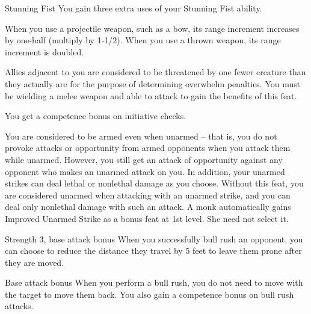  Stunning Fist
 You gain three extra uses of your Stunning Fist ability.

 When you use a projectile weapon, such as a bow, its range increment increases by one-half (multiply by 1-1/2). When you use a thrown weapon, its range increment is doubled.


 Allies adjacent to you are considered to be threatened by one fewer creature than they actually are for the purpose of determining overwhelm penalties. You must be wielding a melee weapon and able to attack to gain the benefits of this feat.

 You get a  competence bonus on initiative checks.

 You are considered to be armed even when unarmed -- that is, you do not provoke attacks or opportunity from armed opponents when you attack them while unarmed. However, you still get an attack of opportunity against any opponent who makes an unarmed attack on you.
In addition, your unarmed strikes can deal lethal or nonlethal damage as you choose.
 Without this feat, you are considered unarmed when attacking with an unarmed strike, and you can deal only nonlethal damage with such an attack.
 A monk automatically gains Improved Unarmed Strike as a bonus feat at 1st level. She need not select it.

\featpres Strength 3, base attack bonus 
\featben When you successfully bull rush an opponent, you can choose to reduce the distance they travel by 5 feet to leave them prone after they are moved.

 Base attack bonus 
 When you perform a bull rush, you do not need to move with the target to move them back. You also gain a  competence bonus on bull rush attacks.

